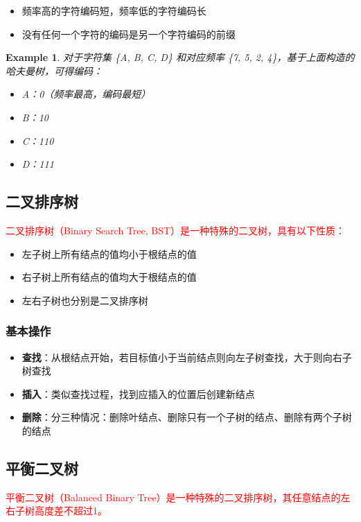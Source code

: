 \documentclass{../../note}
\newtheorem{example}{Example}
\begin{document}
\begin{itemize}
\item 频率高的字符编码短，频率低的字符编码长
\item 没有任何一个字符的编码是另一个字符编码的前缀
\end{itemize}

\begin{example}
对于字符集 \{A, B, C, D\} 和对应频率 \{7, 5, 2, 4\}，基于上面构造的哈夫曼树，可得编码：
\begin{itemize}
  \item A：0（频率最高，编码最短）
  \item B：10
  \item C：110
  \item D：111
\end{itemize}
\end{example}

\subsection{二叉排序树}

\textcolor{red}{二叉排序树（Binary Search Tree, BST）是一种特殊的二叉树，具有以下性质：}
\begin{itemize}
\item 左子树上所有结点的值均小于根结点的值
\item 右子树上所有结点的值均大于根结点的值
\item 左右子树也分别是二叉排序树
\end{itemize}

\subsubsection{基本操作}
\begin{itemize}
\item \textbf{查找}：从根结点开始，若目标值小于当前结点则向左子树查找，大于则向右子树查找
\item \textbf{插入}：类似查找过程，找到应插入的位置后创建新结点
\item \textbf{删除}：分三种情况：删除叶结点、删除只有一个子树的结点、删除有两个子树的结点
\end{itemize}

\subsection{平衡二叉树}

\textcolor{red}{平衡二叉树（Balanced Binary Tree）是一种特殊的二叉排序树，其任意结点的左右子树高度差不超过1。}
\end{document}
